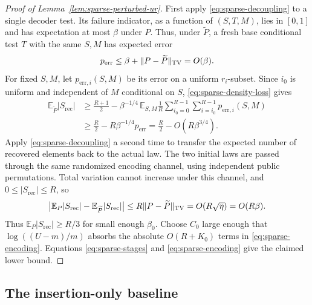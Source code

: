 \documentclass[11pt,letterpaper]{article}
\numberwithin{equation}{section}
\newcommand{\E}{\mathbb E}
\begin{document}
\begin{proof}[Proof of Lemma~\ref{lem:sparse-perturbed-ur}]
First apply \eqref{eq:sparse-decoupling} to a single decoder test.
Its failure indicator, as a function of $(S,T,M)$, lies in $[0,1]$ and has expectation at most $\beta$ under $P$.
Thus, under $\widetilde P$, a fresh base conditional test $T$ with the same $S,M$ has expected error
\[
 p_{\mathrm{err}}\le\beta+\|P-\widetilde P\|_{\rm TV}=O(\beta).
\]
For fixed $S,M$, let $p_{\mathrm{err},i}(S,M)$ be its error on a uniform $r_i$-subset.
Since $i_0$ is uniform and independent of $M$ conditional on $S$, \eqref{eq:sparse-density-loss} gives
\begin{align*}
 \E_{\widetilde P}|S_{\mathrm{rec}}|
 &\ge\frac{R+1}{2}
  -\beta^{-1/4}\,
    \E_{S,M}\frac1R
       \sum_{i_0=0}^{R-1}\sum_{i=i_0}^{R-1}p_{\mathrm{err},i}(S,M)\\
 &\ge\frac R2-R\beta^{-1/4}p_{\mathrm{err}}
  =\frac R2-O(R\beta^{3/4}).
\end{align*}
Apply \eqref{eq:sparse-decoupling} a second time to transfer the expected number of recovered elements back to the actual law.
The two initial laws are passed through the same randomized encoding channel, using independent public permutations.
Total variation cannot increase under this channel, and $0\le|S_{\mathrm{rec}}|\le R$, so
\[
 \bigl|\E_P|S_{\mathrm{rec}}|-\E_{\widetilde P}|S_{\mathrm{rec}}|\bigr|
 \le R\|P-\widetilde P\|_{\rm TV}
 =O(R\sqrt\eta)=O(R\beta).
\]
Thus $\E_P|S_{\mathrm{rec}}|\ge R/3$ for small enough $\beta_0$.
Choose $C_0$ large enough that $\log((U-m)/m)$ absorbs the absolute $O(R+K_0)$ terms in \eqref{eq:sparse-encoding}.
Equations \eqref{eq:sparse-stages} and \eqref{eq:sparse-encoding} give the claimed lower bound.
\end{proof}


\subsection{The insertion-only baseline}
\label{app:insertion-baseline}
\end{document}
